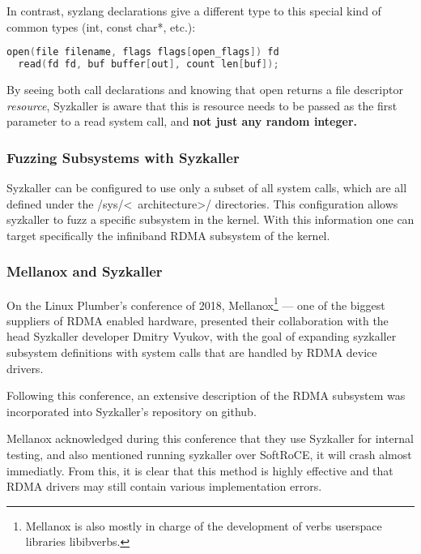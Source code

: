 In contrast, syzlang declarations give a different type to this special kind of common types (int, const char*, etc.):

\begin{lstlisting}[caption={syzlang definitions for open and read}, label={lst:syzlangdefs}, language=c]
  open(file filename, flags flags[open_flags]) fd
  read(fd fd, buf buffer[out], count len[buf]);
\end{lstlisting}

By seeing both call declarations and knowing that open returns a file descriptor \emph{resource}, Syzkaller is aware
that this is resource needs to be passed as the first parameter to a read system call, and \textbf{not just any random integer.}

\subsubsection{Fuzzing Subsystems with Syzkaller}

Syzkaller can be configured to use only a subset of all system calls, which are all defined under
the /sys/\textless~architecture\textgreater/ directories. This configuration allows syzkaller to fuzz
a specific subsystem in the kernel. With this information one can target specifically
the infiniband RDMA subsystem of the kernel.

\subsubsection{Mellanox and Syzkaller}

On the Linux Plumber's conference of 2018, Mellanox\footnote{Mellanox is also mostly in charge of the development  of verbs userspace libraries libibverbs.} --- one of the biggest suppliers of RDMA enabled hardware,
presented their collaboration with the head Syzkaller
developer Dmitry Vyukov, with the goal of expanding syzkaller subsystem definitions with system calls
that are handled by RDMA device drivers\cite{osherovichImprovingTestingRDMA2018}.

Following this conference, an extensive description of the RDMA subsystem was incorporated into Syzkaller's repository on github.

Mellanox acknowledged during this conference that they use Syzkaller for internal testing,
and also mentioned running syzkaller over SoftRoCE, it will crash almost immediatly. From this, it is clear
that this method is highly effective and that RDMA drivers may still contain various implementation errors.

